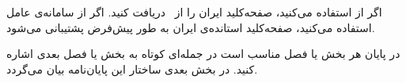 	 اگر از   استفاده می‌کنید، صفحه‌کلید  ایران را از~ دریافت کنید. اگر از  سامانه‌ی عامل  استفاده می‌کنید،   صفحه‌کلید استانده‌ی ایران  به طور پیش‌فرض پشتیبانی می‌شود.
	

در پایان هر بخش یا فصل مناسب است در جمله‌ای کوتاه به بخش یا فصل بعدی اشاره کنید. در بخش بعدی ساختار این پایان‌نامه بیان می‌گردد.
